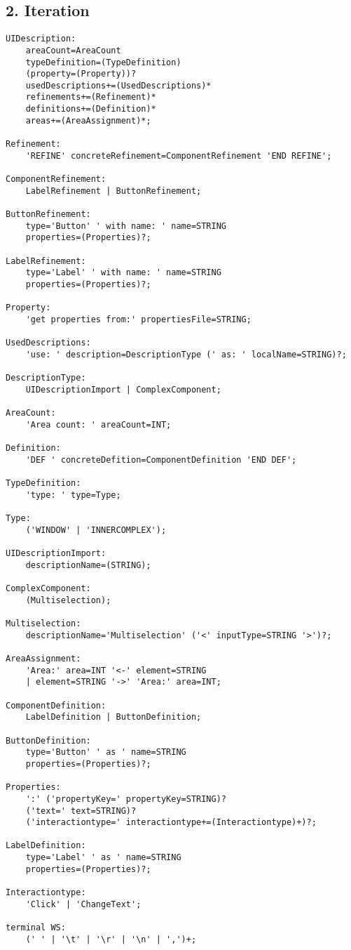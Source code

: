 \subsection*{2. Iteration}
\begin{lstlisting}
UIDescription:
	areaCount=AreaCount
	typeDefinition=(TypeDefinition)
	(property=(Property))?
	usedDescriptions+=(UsedDescriptions)*
	refinements+=(Refinement)*
	definitions+=(Definition)*
	areas+=(AreaAssignment)*;

Refinement:
	'REFINE' concreteRefinement=ComponentRefinement 'END REFINE';

ComponentRefinement:
	LabelRefinement | ButtonRefinement;

ButtonRefinement:
	type='Button' ' with name: ' name=STRING
	properties=(Properties)?;

LabelRefinement:
	type='Label' ' with name: ' name=STRING
	properties=(Properties)?;

Property:
	'get properties from:' propertiesFile=STRING;

UsedDescriptions:
	'use: ' description=DescriptionType (' as: ' localName=STRING)?;

DescriptionType:
	UIDescriptionImport | ComplexComponent;

AreaCount:
	'Area count: ' areaCount=INT;

Definition:
	'DEF ' concreteDefition=ComponentDefinition 'END DEF';

TypeDefinition:
	'type: ' type=Type;

Type:
	('WINDOW' | 'INNERCOMPLEX');

UIDescriptionImport:
	descriptionName=(STRING);

ComplexComponent:
	(Multiselection);

Multiselection:
	descriptionName='Multiselection' ('<' inputType=STRING '>')?;

AreaAssignment:
	'Area:' area=INT '<-' element=STRING
	| element=STRING '->' 'Area:' area=INT;

ComponentDefinition:
	LabelDefinition | ButtonDefinition;

ButtonDefinition:
	type='Button' ' as ' name=STRING
	properties=(Properties)?;

Properties:
	':' ('propertyKey=' propertyKey=STRING)?
	('text=' text=STRING)?
	('interactiontype=' interactiontype+=(Interactiontype)+)?;

LabelDefinition:
	type='Label' ' as ' name=STRING
	properties=(Properties)?;

Interactiontype:
	'Click' | 'ChangeText';

terminal WS:
	(' ' | '\t' | '\r' | '\n' | ',')+;

\end{lstlisting}

